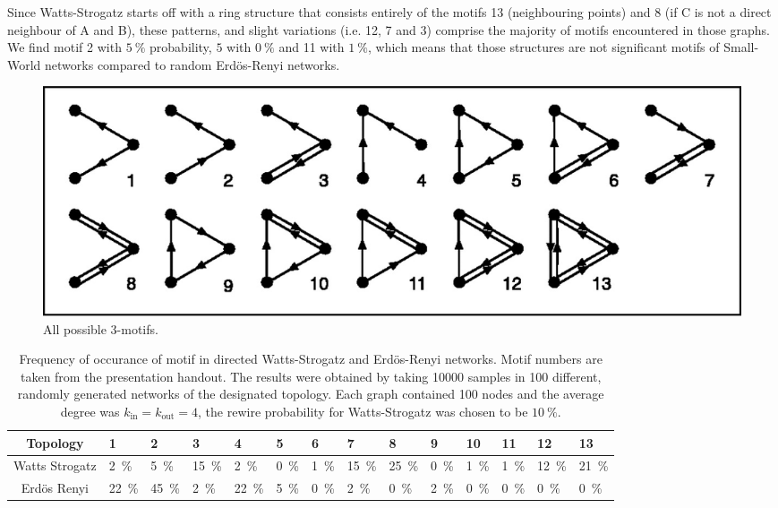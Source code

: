 \documentclass{scrartcl}
\begin{document}
Since Watts-Strogatz starts off with a ring structure that consists
entirely of the motifs 13 (neighbouring points) and 8 (if C is not a direct
neighbour of A and B), these patterns, and slight variations (i.e. 12,
7 and 3) comprise the majority of motifs encountered in those graphs. We
find motif 2 with $\SI{5}{\percent}$ probability, $5$ with
$\SI{0}{\percent}$ and 11 with $\SI{1}{\percent}$, which means that those
structures are not significant motifs of Small-World networks compared to
random Erdös-Renyi networks.


\begin{figure}
	\centering
		\includegraphics[width=1.00\textwidth]{pictures/motifs.png}
	\caption{All possible 3-motifs.}
	\label{fig:motifs}
\end{figure}

\begin{table}
	\centering
		\begin{tabular}{c|*{13}{l}}
		\toprule
		Topology & \num{1} & 2 & 3 & 4 & 5 &6 & 7 & 8 & 9 & 10 &11 & 12& 13  \\ \midrule
		Watts Strogatz & \SI{2}{\percent} & \SI{5}{\percent} & \SI{15}{\percent} & \SI{2}{\percent} & \SI{0}{\percent} & \SI{1}{\percent} & \SI{15}{\percent} & \SI{25}{\percent} & \SI{0}{\percent} & \SI{1}{\percent} & \SI{1}{\percent} & \SI{12}{\percent} & \SI{21}{\percent} \\
		Erdös Renyi & \SI{22}{\percent} & \SI{45}{\percent} & \SI{2}{\percent} & \SI{22}{\percent} & \SI{5}{\percent} & \SI{0}{\percent} & \SI{2}{\percent} & \SI{0}{\percent} & \SI{2}{\percent} & \SI{0}{\percent} & \SI{0}{\percent} & \SI{0}{\percent} & \SI{0}{\percent}\\
		\bottomrule
		\end{tabular}
	\caption{Frequency of occurance of motif in directed Watts-Strogatz and Erdös-Renyi networks. Motif numbers are taken from the presentation handout. The results were obtained by taking 10000 samples in 100 different, randomly generated networks of the designated topology. Each graph contained 100 nodes and the average degree was $k_{\mathrm{in}} = k_{\mathrm{out}}=4$, the rewire probability for Watts-Strogatz was chosen to be $\SI{10}{\percent}$.}
	\label{tab:motifs}
\end{table}
\end{document}
